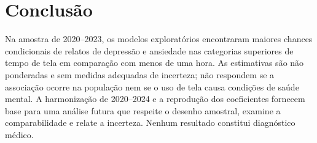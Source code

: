 ﻿\documentclass[12pt]{article}
\begin{document}
\section{Conclusão}
Na amostra de 2020--2023, os modelos exploratórios encontraram maiores chances condicionais de relatos de depressão e ansiedade nas categorias superiores de tempo de tela em comparação com menos de uma hora. As estimativas são não ponderadas e sem medidas adequadas de incerteza; não respondem se a associação ocorre na população nem se o uso de tela causa condições de saúde mental. A harmonização de 2020--2024 e a reprodução dos coeficientes fornecem base para uma análise futura que respeite o desenho amostral, examine a comparabilidade e relate a incerteza. Nenhum resultado constitui diagnóstico médico.


\end{document}
